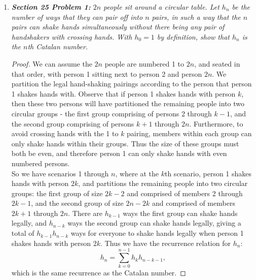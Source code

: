 \documentclass{article}
\begin{document}
\begin{enumerate}[label={\bf Q\arabic*:}]
  \item \it \textbf{Section 25 Problem 1:} $2n$ people sit around a
    circular table. Let $h_n$ be the number of ways that they can pair off
    into $n$ pairs, in such a way that the $n$ pairs can shake hands
    simultaneously without there being any pair of handshakers with
    crossing hands. With $h_0=1$ by definition, show that $h_n$ is the
    $n$th Catalan number.

    \begin{proof}
      We can assume the $2n$ people are numbered 1 to $2n$, and seated in
      that order, with person 1 sitting next to person 2 and person $2n$.
      We partition the legal hand-shaking pairings according to the person
      that person 1 shakes hands with. Observe that if person 1 shakes
      hands with person $k$, then these two persons will have partitioned
      the remaining people into two circular groups - the first group
      comprising of persons 2 through $k-1$, and the second group
      comprising of persons $k+1$ through $2n$. Furthermore, to avoid
      crossing hands with the 1 to $k$ pairing, members within each group
      can only shake hands within their groups. Thus the size of these
      groups must both be even, and therefore person 1 can only shake hands
      with even numbered persons. \\

      So we have scenarios 1 through $n$, where at the $k$th scenario,
      person 1 shakes hands with person $2k$, and partitions the remaining
      people into two circular groups: the first group of size $2k-2$ and
      comprised of members 2 through $2k-1$, and the second group of size
      $2n-2k$ and comprised of members $2k+1$ through $2n$.
      There are $h_{k-1}$ ways the first group can shake hands legally, and
      $h_{n-k}$ ways the second group can shake hands legally, giving a
      total of $h_{k-1}h_{n-k}$ ways for everyone to shake hands legally
      when person 1 shakes hands with person $2k$. Thus we have the
      recurrence relation for $h_n$:
      \[h_n =\sum_{k=0}^{n-1} h_kh_{n-k-1},\]
      which is the same recurrence as the Catalan number.
    \end{proof}
\end{enumerate}
\end{document}
